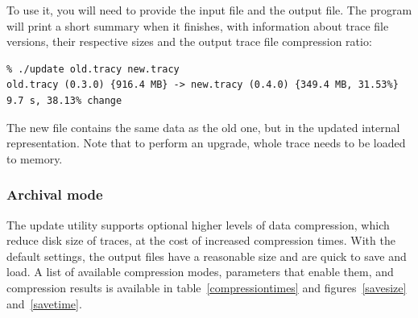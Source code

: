 \documentclass[hidelinks,titlepage,a4paper]{article}
\begin{document}
To use it, you will need to provide the input file and the output file. The program will print a short summary when it finishes, with information about trace file versions, their respective sizes and the output trace file compression ratio:

\begin{verbatim}
% ./update old.tracy new.tracy
old.tracy (0.3.0) {916.4 MB} -> new.tracy (0.4.0) {349.4 MB, 31.53%}  9.7 s, 38.13% change
\end{verbatim}

The new file contains the same data as the old one, but in the updated internal representation. Note that to perform an upgrade, whole trace needs to be loaded to memory.

\subsubsection{Archival mode}

The update utility supports optional higher levels of data compression, which reduce disk size of traces, at the cost of increased compression times. With the default settings, the output files have a reasonable size and are quick to save and load. A list of available compression modes, parameters that enable them, and compression results is available in table~\ref{compressiontimes} and figures~\ref{savesize} and~\ref{savetime}.
\end{document}

